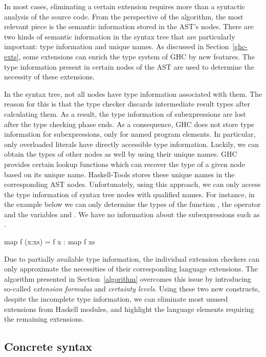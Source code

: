\documentclass[main.tex]{subfiles}
\begin{document}
	In most cases, eliminating a certain extension requires more than a syntactic analysis of the source code. From the perspective of the algorithm, the most relevant piece is the semantic information stored in the AST's nodes. There are two kinds of semantic information in the syntax tree that are particularly important: type information and unique names. As discussed in Section~\ref{ghc-exts}, some extensions can enrich the type system of GHC by new features. The type information present in certain nodes of the AST are used to determine the necessity of these extensions.
	
	In the syntax tree, not all nodes have type information associated with them. The reason for this is that the type checker discards intermediate result types after calculating them. As a result, the type information of subexpressions are lost after the type checking phase ends. As a consequence, GHC does not store type information for subexpressions, only for named program elements. In particular, only overloaded literals have directly accessible type information. Luckily, we can obtain the types of other nodes as well by using their unique names. GHC provides certain lookup functions which can recover the type of a given node based on its unique name. Haskell-Tools stores these unique names in the corresponding AST nodes. Unfortunately, using this approach, we can only access the type information of syntax tree nodes with qualified names. For instance, in the example below we can only determine the types of the function , the operator \ilcode{(:)} and the variables  and . We have no information about the subexpressions such as .
	
	\begin{oneLineHaskell}
		map f (x:xs) = f x : map f xs
	\end{oneLineHaskell}
	
	Due to partially available type information, the individual extension checkers can only approximate the necessities of their corresponding language extensions. The algorithm presented in Section~\ref{algorithm} overcomes this issue by introducing so-called \emph{extension formulas} and \emph{certainty levels}. Using these two new constructs, despite the incomplete type information, we can eliminate most unused extensions from Haskell modules, and highlight the language elements requiring the remaining extensions.
	
	\subsection{Concrete syntax}
	
\end{document}
